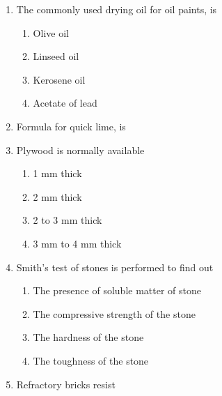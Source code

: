 \documentclass[11pt,a4paper]{article}
\begin{document}
\begin{enumerate}
{ (iii) Hydraulic lime is suitable for making mortar, \\
 (iv) Fat lime is suitable for making mortar.}
\\
\item{The commonly used drying oil for oil paints, is}
\begin{enumerate}[label=\Alph*.]
\item{Olive oil}
\item{Linseed oil}
\item{Kerosene oil}
\item{Acetate of lead}
\end{enumerate}
\item{Formula for quick lime, is}
\\
\item{Plywood is normally available}
\begin{enumerate}[label=\Alph*.]
\item{1 mm thick}
\item{2 mm thick}
\item{2 to 3 mm thick}
\item{3 mm to 4 mm thick}
\end{enumerate}
\item{Smith's test of stones is performed to find out}
\begin{enumerate}[label=\Alph*.]
\item{The presence of soluble matter of stone}
\item{The compressive strength of the stone}
\item{The hardness of the stone}
\item{The toughness of the stone}
\end{enumerate}
\item{Refractory bricks resist}

\end{enumerate}
\end{document}
